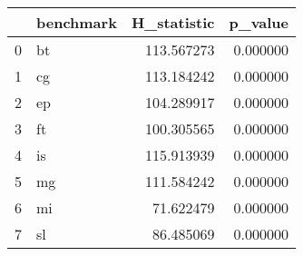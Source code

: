 \begin{tabular}{llrr}
\toprule
 & benchmark & H_statistic & p_value \\
\midrule
0 & bt & 113.567273 & 0.000000 \\
1 & cg & 113.184242 & 0.000000 \\
2 & ep & 104.289917 & 0.000000 \\
3 & ft & 100.305565 & 0.000000 \\
4 & is & 115.913939 & 0.000000 \\
5 & mg & 111.584242 & 0.000000 \\
6 & mi & 71.622479 & 0.000000 \\
7 & sl & 86.485069 & 0.000000 \\
\bottomrule
\end{tabular}
